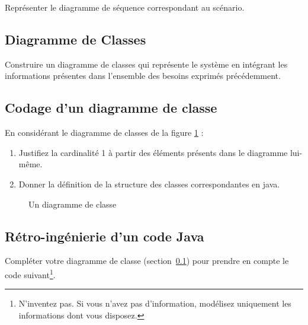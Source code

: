 \documentclass[12pt]{article}
\begin{document}
Représenter  le  diagramme  de  séquence  correspondant  au  scénario.

\subsection{Diagramme de Classes}\label{mondc}

Construire un diagramme de classes qui représente le système en intégrant les  informations présentes dans l’ensemble des besoins exprimés précédemment.

\subsection{Codage d'un diagramme de classe}

En considérant le diagramme de classes de la figure \ref{dc} :

\begin{enumerate}
\item Justifiez la cardinalité 1 à partir des éléments présents dans le diagramme lui-même.
\item Donner la définition de la structure des classes  correspondantes en java.
\end{enumerate}

\begin{figure}
\caption{Un diagramme de classe}\label{dc}
\end{figure}

\subsection{Rétro-ingénierie d'un code Java}

Compléter  votre  diagramme  de  classe (section~\ref{mondc}) pour  prendre  en  compte  le  code  suivant\footnote{N’inventez pas. Si vous n’avez pas d’information, modélisez uniquement les informations dont vous disposez.}.
\end{document}
